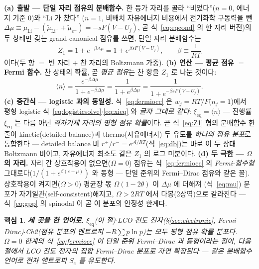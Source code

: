 \documentclass[11pt,a4paper]{article}
\newtheorem*{keybox}{핵심}
\newcommand{\eq}{\mathrm{eq}}
\begin{document}
\textbf{(a) 출발 — 단일 자리 점유의 분배함수.} 한 등가 자리를 골라 ``비었다''($n=0$, 에너지 기준 $0$)와 ``Li 가 찼다''
($n=1$, 비배치 자유에너지 비용에서 전기화학 구동력을 뺀 $\Delta\mu\equiv\mu_\mathrm{Li}-(\tilde\mu_{\mathrm{Li}^+}+
\tilde\mu_{e^-})=-sF(V-U_j)$, 곧 식~\eqref{eq:eqcond} 의 한 자리 버전)의 두 상태만 갖는 grand-canonical 점유를 쓰면,
단일 자리 분배함수는
\begin{equation}
Z_1=1+e^{-\beta\Delta\mu}=1+e^{\,\beta sF(V-U_j)},\qquad \beta\equiv\frac{1}{RT}
\label{eq:Z1}
\end{equation}
이다(두 항 $=$ 빈 자리 $+$ 찬 자리의 Boltzmann 가중). \textbf{(b) 연산 — 평균 점유 $=$ Fermi 함수.} 찬 상태의 확률,
곧 \emph{평균 점유}는 찬 항을 $Z_1$ 로 나눈 것이다:
\begin{equation}
\langle n\rangle=\frac{e^{-\beta\Delta\mu}}{1+e^{-\beta\Delta\mu}}
=\frac{1}{1+e^{\beta\Delta\mu}}
=\frac{1}{1+e^{-\beta sF(V-U_j)}}.
\label{eq:fermiocc}
\end{equation}
\textbf{(c) 중간식 — logistic 과의 동일성.} 식~\eqref{eq:fermiocc} 은 $w_j=RT/F$($n_j=1$)에서 평형 logistic
식~\eqref{eq:logisticsolve}$\cdot$\eqref{eq:xieq} 와 \emph{글자 그대로 같다}: $\xi_\eq=\langle n\rangle$ — 진행률
$\xi_\eq$ 는 다름 아닌 \emph{격자기체 자리의 평형 점유 확률}이다. 곧 식~\eqref{eq:Z1} 형의 분배함수 한 줄이
kinetic(detailed balance)과 thermo(자유에너지) 두 유도를 \emph{하나의 점유 분포}로 통합한다 — detailed balance 비
$r^+/r^-=e^{\mathcal A/RT}$(식~\eqref{eq:db})는 바로 이 두 상태 Boltzmann 비이고, 자유에너지 최소도 같은 $Z_1$ 의
로그 미분이다. \textbf{(d) 두 극한 — $\Omega$ 의 자리.} 자리 간 상호작용이 없으면($\Omega=0$) 점유는
식~\eqref{eq:fermiocc} 의 \emph{Fermi-함수형} 그대로다($1/(1+e^{\beta(\varepsilon-\mu)})$ 와 동형 — 단일 준위의
Fermi--Dirac 점유와 같은 꼴). 상호작용이 켜지면($\Omega>0$) 평균장 몫 $\Omega(1-2\theta)$ 이 $\Delta\mu$ 에 더해져
(식~\eqref{eq:mu}) 분포가 자기일관(self-consistent)해지고, $\Omega>2RT$ 에서 다봉(2상역)으로 갈라진다 — 식~\eqref{eq:gpp}
의 spinodal 이 곧 이 분포의 안정성 한계다.

\begin{keybox}
\textbf{세 곳을 한 언어로.} $\xi_\eq$(이 절)$\cdot$LCO 전도 전자(\S\ref{sec:electronic}, Fermi--Dirac)$\cdot$Ch2(점유
분포의 엔트로피 $-R\sum p\ln p$)는 모두 \emph{평형 점유 확률 분포}다. $\Omega=0$ 한계의 식~\eqref{eq:fermiocc} 이
단일 준위 Fermi--Dirac 과 동형이라는 점이, 다음 절에서 LCO 전도 전자의 \emph{집합} Fermi--Dirac 분포로 자연 확장된다 —
같은 분배함수 언어로 전자 엔트로피 $S_e$ 를 유도한다.
\end{keybox}
\end{document}

